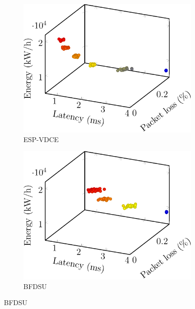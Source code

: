 \begin{enumerate}
\begin{figure}[t!]
                  \vspace{1em}

                  \begin{subfigure}[b]{0.32\linewidth}
                        \includegraphics[width=\textwidth]{figs/comparison/esp_vdce-crop}
                        \caption{ESP-VDCE \cite{TODO}}
                  \end{subfigure}
                  \begin{subfigure}[b]{0.32\linewidth}
                        \includegraphics[width=\textwidth]{figs/comparison/bfdsu-crop}
                        \caption{BFDSU \cite{TODO}}
                  \end{subfigure}

\end{figure}
\end{enumerate}
